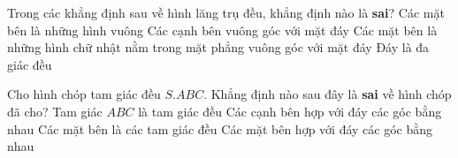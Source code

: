\begin{ex}%
	 Trong các khẳng định sau về hình lăng trụ đều, khẳng định nào là \textbf{sai}?
	\choice 
		{\True Các  mặt bên là những hình vuông}
		{Các cạnh bên vuông góc với  mặt đáy}
		{Các mặt bên là những hình chữ nhật nằm trong  mặt phẳng vuông góc với mặt đáy}
		{Đáy  là đa giác đều}
\end{ex}

\begin{ex}%
	Cho hình chóp tam giác đều $S.ABC$. Khẳng định nào sau đây là  \textbf{sai} về hình chóp đã cho?
	\choice 
		{Tam giác  $ABC$ là tam giác đều}
		{Các cạnh bên hợp với đáy các góc bằng  nhau}
		{\True Các mặt bên là các tam giác  đều}
		 {Các mặt bên hợp với đáy các góc bằng nhau}
\end{ex}

